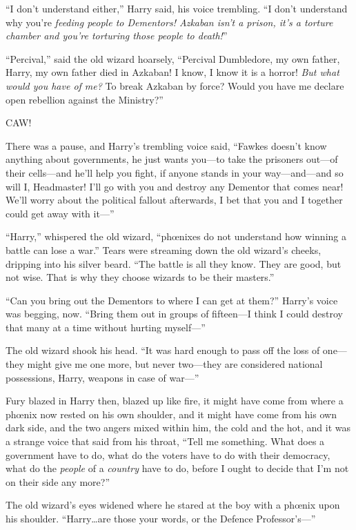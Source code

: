 “I don’t understand either,” Harry said, his voice trembling. “I don’t understand why you’re \emph{feeding people to Dementors! Azkaban isn’t a prison, it’s a torture chamber and you’re torturing those people to \emph{death}!}”

“Percival,” said the old wizard hoarsely, “Percival Dumbledore, my own father, Harry, my own father died in Azkaban! I know, I know it is a horror! \emph{But what would you have of me?} To break Azkaban by force? Would you have me declare open rebellion against the Ministry?”

CAW!

There was a pause, and Harry’s trembling voice said, “Fawkes doesn’t know anything about governments, he just wants you—to take the prisoners out—of their cells—and he’ll help you fight, if anyone stands in your way—and—and so will I, Headmaster! I’ll go with you and destroy any Dementor that comes near! We’ll worry about the political fallout afterwards, I bet that you and I together could get away with it—”

“Harry,” whispered the old wizard, “phœnixes do not understand how winning a battle can lose a war.” Tears were streaming down the old wizard’s cheeks, dripping into his silver beard. “The battle is all they know. They are good, but not wise. That is why they choose wizards to be their masters.”

“Can you bring out the Dementors to where I can get at them?” Harry’s voice was begging, now. “Bring them out in groups of fifteen—I think I could destroy that many at a time without hurting myself—”

The old wizard shook his head. “It was hard enough to pass off the loss of one—they might give me one more, but never two—they are considered national possessions, Harry, weapons in case of war—”

Fury blazed in Harry then, blazed up like fire, it might have come from where a phœnix now rested on his own shoulder, and it might have come from his own dark side, and the two angers mixed within him, the cold and the hot, and it was a strange voice that said from his throat, “Tell me something. What does a government have to do, what do the voters have to do with their democracy, what do the \emph{people} of a \emph{country} have to do, before I ought to decide that I’m not on their side any more?”

The old wizard’s eyes widened where he stared at the boy with a phœnix upon his shoulder. “Harry…are those your words, or the Defence Professor’s—”

